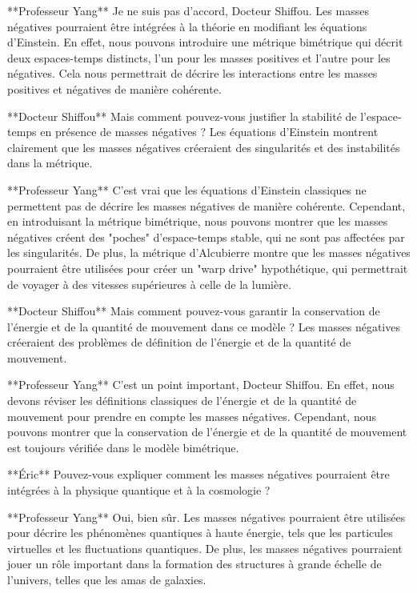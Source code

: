**Professeur Yang**
Je ne suis pas d'accord, Docteur Shiffou. Les masses négatives pourraient être intégrées à la théorie en modifiant les équations d'Einstein. En effet, nous pouvons introduire une métrique bimétrique qui décrit deux espaces-temps distincts, l'un pour les masses positives et l'autre pour les négatives. Cela nous permettrait de décrire les interactions entre les masses positives et négatives de manière cohérente.

**Docteur Shiffou**
Mais comment pouvez-vous justifier la stabilité de l'espace-temps en présence de masses négatives ? Les équations d'Einstein montrent clairement que les masses négatives créeraient des singularités et des instabilités dans la métrique.

**Professeur Yang**
C'est vrai que les équations d'Einstein classiques ne permettent pas de décrire les masses négatives de manière cohérente. Cependant, en introduisant la métrique bimétrique, nous pouvons montrer que les masses négatives créent des "poches" d'espace-temps stable, qui ne sont pas affectées par les singularités. De plus, la métrique d'Alcubierre montre que les masses négatives pourraient être utilisées pour créer un "warp drive" hypothétique, qui permettrait de voyager à des vitesses supérieures à celle de la lumière.

**Docteur Shiffou**
Mais comment pouvez-vous garantir la conservation de l'énergie et de la quantité de mouvement dans ce modèle ? Les masses négatives créeraient des problèmes de définition de l'énergie et de la quantité de mouvement.

**Professeur Yang**
C'est un point important, Docteur Shiffou. En effet, nous devons réviser les définitions classiques de l'énergie et de la quantité de mouvement pour prendre en compte les masses négatives. Cependant, nous pouvons montrer que la conservation de l'énergie et de la quantité de mouvement est toujours vérifiée dans le modèle bimétrique.

**Éric**
Pouvez-vous expliquer comment les masses négatives pourraient être intégrées à la physique quantique et à la cosmologie ?

**Professeur Yang**
Oui, bien sûr. Les masses négatives pourraient être utilisées pour décrire les phénomènes quantiques à haute énergie, tels que les particules virtuelles et les fluctuations quantiques. De plus, les masses négatives pourraient jouer un rôle important dans la formation des structures à grande échelle de l'univers, telles que les amas de galaxies.

